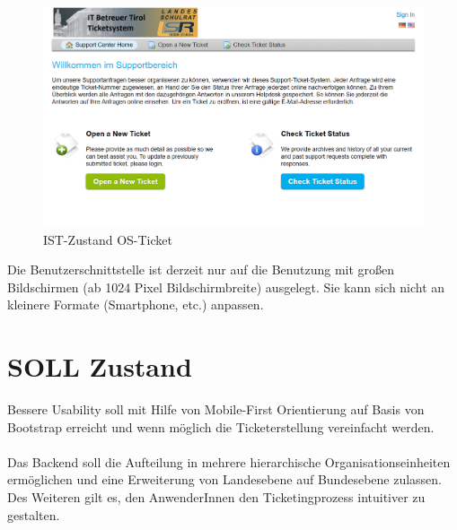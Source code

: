 \begin{figure}[h]
	\centering
	\includegraphics[scale=0.7]{figures/Ist_Login.png}
	\caption{IST-Zustand OS-Ticket}
	\label{Abb_IST-Zustand}
\end{figure}
\noindent Die Benutzerschnittstelle ist derzeit nur auf die Benutzung mit großen Bildschirmen (ab 1024 Pixel Bildschirmbreite) ausgelegt. Sie kann sich nicht an kleinere Formate (Smartphone, etc.) anpassen.

\section{SOLL Zustand}
\vspace{-.4cm}
Bessere Usability soll mit Hilfe von Mobile-First Orientierung auf Basis von Bootstrap erreicht und wenn möglich die Ticketerstellung vereinfacht werden.
\vspace{-.8cm}
\paragraph{}
Das Backend soll die Aufteilung in mehrere hierarchische Organisationseinheiten ermöglichen und eine Erweiterung von Landesebene auf Bundesebene zulassen. Des Weiteren gilt es, den AnwenderInnen den Ticketingprozess intuitiver zu gestalten.

\vspace{-.5cm}
